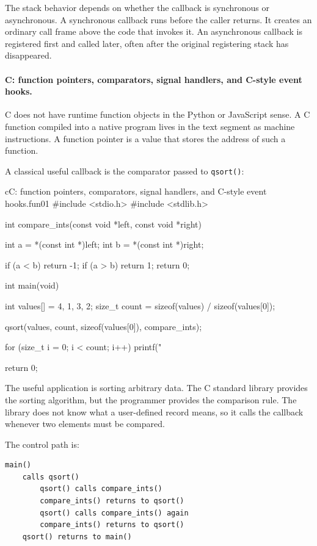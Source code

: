\documentclass[a4paper,twoside]{report}
\begin{document}
The stack behavior depends on whether the callback is synchronous or asynchronous. A synchronous callback runs before the caller returns. It creates an ordinary call frame above the code that invokes it. An asynchronous callback is registered first and called later, often after the original registering stack has disappeared.

\paragraph{C: function pointers, comparators, signal handlers, and C-style event hooks.}

C does not have runtime function objects in the Python or JavaScript sense. A C function compiled into a native program lives in the text segment as machine instructions. A function pointer is a value that stores the address of such a function.

A classical useful callback is the comparator passed to \texttt{qsort()}:

\begin{codebox}[]{c}{C: function pointers, comparators, signal handlers, and C-style event hooks.}{fun01}
#include <stdio.h>
#include <stdlib.h>

int compare_ints(const void *left, const void *right) {
    int a = *(const int *)left;
    int b = *(const int *)right;

    if (a < b) return -1;
    if (a > b) return 1;
    return 0;
}

int main(void) {
    int values[] = {4, 1, 3, 2};
    size_t count = sizeof(values) / sizeof(values[0]);

    qsort(values, count, sizeof(values[0]), compare_ints);

    for (size_t i = 0; i < count; i++) {
        printf("%
    }

    return 0;
}
\end{codebox}


The useful application is sorting arbitrary data. The C standard library provides the sorting algorithm, but the programmer provides the comparison rule. The library does not know what a user-defined record means, so it calls the callback whenever two elements must be compared.

The control path is:

\begin{verbatim}
main()
    calls qsort()
        qsort() calls compare_ints()
        compare_ints() returns to qsort()
        qsort() calls compare_ints() again
        compare_ints() returns to qsort()
    qsort() returns to main()
\end{verbatim}
\end{document}
